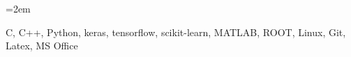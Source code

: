 \documentclass[xcolor=dvipsnames]{scrartcl}
\newcommand{\MarginText}[1]{\marginpar{\raggedleft\itshape\small#1}} %
\newcommand{\Description}[1]{\hangindent=2em\hangafter=0\noindent\raggedright\footnotesize{#1}\par\normalsize\vspace{1em}} %
\begin{document}
\begin{cv}{}
\noindent{}\vspace{0.5em}

\Description{C, C++, Python, keras, tensorflow, scikit-learn, MATLAB, ROOT, Linux, Git, Latex, MS Office}



\vspace{1em} %


\noindent{}\vspace{0.5em}










\vspace{1em}

\newlength{\langbox} %
\settowidth{\langbox}{English} %


\end{cv}
\end{document}
